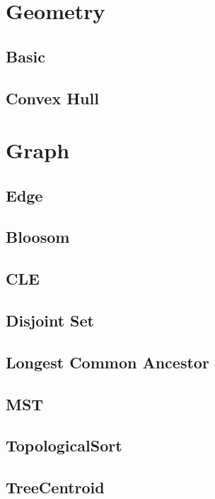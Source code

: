 \section{Geometry}

\subsection{Basic}

\subsection{Convex Hull}


\section{Graph}

\subsection{Edge}

\subsection{Bloosom}

\subsection{CLE}

\subsection{Disjoint Set}

\subsection{Longest Common Ancestor}

\subsection{MST}

\subsection{TopologicalSort}

\subsection{TreeCentroid}


